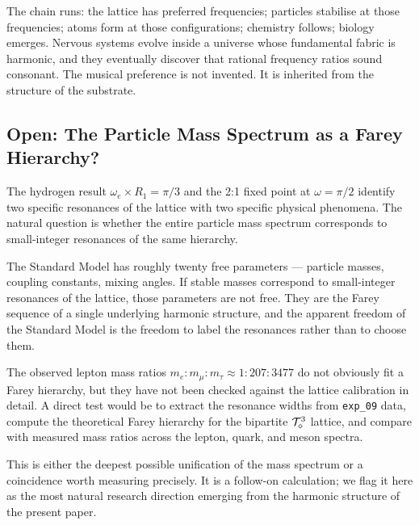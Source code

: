 The chain runs: the lattice has preferred frequencies; particles
stabilise at those frequencies; atoms form at those configurations;
chemistry follows; biology emerges. Nervous systems evolve inside
a universe whose fundamental fabric is harmonic, and they
eventually discover that rational frequency ratios sound consonant.
The musical preference is not invented. It is inherited from the
structure of the substrate.

\subsection{Open: The Particle Mass Spectrum as a Farey Hierarchy?}
\label{subsec:open_mass_spectrum}

The hydrogen result $\omega_e \times R_1 = \pi/3$ and the
2:1 fixed point at $\omega = \pi/2$ identify two specific resonances
of the lattice with two specific physical phenomena. The natural
question is whether the entire particle mass spectrum corresponds
to small-integer resonances of the same hierarchy.

The Standard Model has roughly twenty free parameters --- particle
masses, coupling constants, mixing angles. If stable masses
correspond to small-integer resonances of the lattice, those
parameters are not free. They are the Farey sequence of a single
underlying harmonic structure, and the apparent freedom of the
Standard Model is the freedom to label the resonances rather than
to choose them.

The observed lepton mass ratios
$m_e : m_\mu : m_\tau \approx 1 : 207 : 3477$
do not obviously fit a Farey hierarchy, but they have not been
checked against the lattice calibration in detail. A direct test
would be to extract the resonance widths from \texttt{exp\_09}
data, compute the theoretical Farey hierarchy for the bipartite
$\mathcal{T}_\diamond^3$ lattice, and compare with measured mass ratios across
the lepton, quark, and meson spectra.

This is either the deepest possible unification of the mass
spectrum or a coincidence worth measuring precisely. It is a
follow-on calculation; we flag it here as the most natural
research direction emerging from the harmonic structure of the
present paper.

